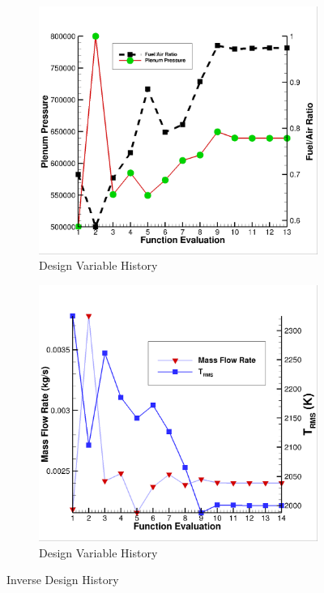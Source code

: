 \begin{figure}[h]
  \centering
  \begin{subfigure}[b]{0.45\textwidth}
    \includegraphics[width=\textwidth]{figures/1st-H2/dv_hist.png}
    \caption{Design Variable History}
    \label{fig:dv-hist-1st-H2}
  \end{subfigure}
  \begin{subfigure}[b]{0.45\textwidth}
    \includegraphics[width=\textwidth]{figures/1st-H2/fm_hist.png}
    \caption{Design Variable History}
    \label{fig:fm-hist-1st-H2}
  \end{subfigure}
  \caption{Inverse Design History}
\end{figure}
